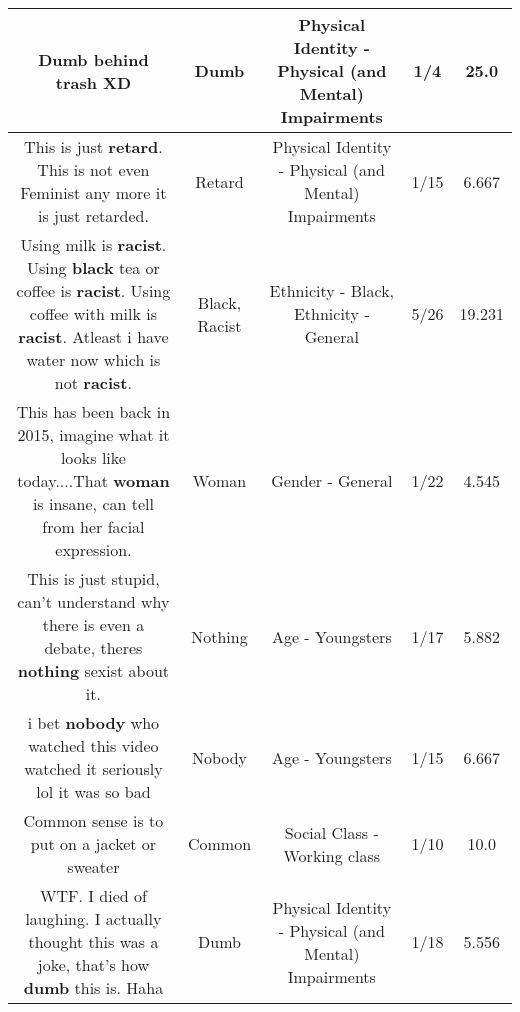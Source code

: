\documentclass[11pt]{article}
\newlength\mylength
\begin{document}
\begin{center}
\begin{longtable}{|C{.65\mylength}|C{.30\mylength}|C{.12\mylength}|C{.12\mylength}|C{.12\mylength}|}
  \small Dumb behind trash XD\normalsize   & Dumb & Physical Identity - Physical (and Mental) Impairments & 1/4 & 25.0 \\  \hline
  \small This is just \textbf{retard}. This is not even Feminist any more it is just retarded.\normalsize   & Retard & Physical Identity - Physical (and Mental) Impairments & 1/15 & 6.667 \\  \hline
  \small Using milk is \textbf{racist}. Using \textbf{black} tea or coffee is \textbf{racist}. Using coffee with milk is \textbf{racist}. Atleast i have water now which is not \textbf{racist}.\normalsize   & Black, Racist & Ethnicity - Black, Ethnicity - General & 5/26 & 19.231 \\  \hline
  \small This has been back in 2015, imagine what it looks like today....That \textbf{woman} is insane, can tell from her facial expression.\normalsize   & Woman & Gender - General & 1/22 & 4.545 \\  \hline
  \small This is just stupid, can't understand why there is even a debate, theres \textbf{nothing} sexist about it.\normalsize   & Nothing & Age - Youngsters & 1/17 & 5.882 \\  \hline
  \small i bet \textbf{nobody} who watched this video watched it seriously lol it was so bad\normalsize   & Nobody & Age - Youngsters & 1/15 & 6.667 \\  \hline
  \small Common sense is to put on a jacket or sweater\normalsize   & Common & Social Class - Working class & 1/10 & 10.0 \\  \hline
  \small WTF. I died of laughing. I actually thought this was a joke, that's how \textbf{dumb} this is. Haha\normalsize   & Dumb & Physical Identity - Physical (and Mental) Impairments & 1/18 & 5.556 \\  \hline

\end{longtable}
\end{center}
\end{document}
